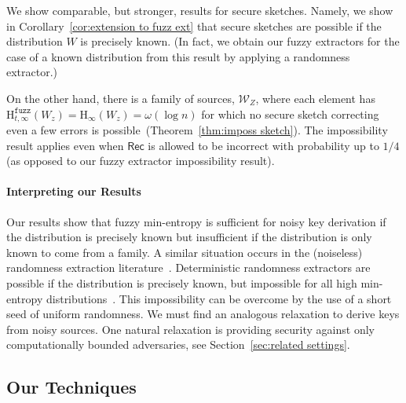 \documentclass[11pt]{article}
\newcommand{\secref}[1]{\mbox{Section~\ref{#1}}}
\newcommand{\thref}[1]{\mbox{Theorem~\ref{#1}}}
\newcommand{\corref}[1]{\mbox{Corollary~\ref{#1}}}
\newcommand{\class}[1]{{\ensuremath{\mathsf{#1}}}}
\newcommand{\rec}{\ensuremath{\class{Rec}}\xspace}
\newcommand{\Hoo}{\mathrm{H}_\infty}
\newcommand{\Hfuzz}{\mathrm{H}^{\mathtt{fuzz}}_{t,\infty}}
\begin{document}
We show comparable, but stronger, results for secure sketches.  Namely, we show in \corref{cor:extension to fuzz ext} that secure sketches are possible if the distribution $W$ is precisely known. (In fact, we obtain our fuzzy extractors for the case of a known distribution from this result by applying a randomness extractor.) 

On the other hand, there is a family of sources, $\mathcal{W}_Z$, where each element has $\Hfuzz(W_z)=\Hoo(W_z) = \omega(\log n)$ for which no secure sketch correcting even a few errors is possible~(\thref{thm:imposs sketch}). The impossibility result applies even when $\rec$ is allowed to be incorrect with probability up to $1/4$ (as opposed to our fuzzy extractor impossibility result). 

\paragraph{Interpreting our Results}
Our results show that fuzzy min-entropy is sufficient for noisy key derivation if the distribution is precisely known but insufficient if the distribution is only known to come from a family.  A similar situation occurs in the (noiseless) randomness extraction literature~\cite{nisan1993randomness}.  Deterministic randomness extractors are possible if the distribution is precisely known, but impossible for all high min-entropy distributions~\cite{santha1986generating}.  This impossibility can be overcome by the use of a short seed of uniform randomness.  
We must find an analogous relaxation to derive keys from noisy sources.  One natural relaxation is providing security against only  computationally bounded adversaries, see \secref{sec:related settings}.

\subsection{Our Techniques}
\end{document}
